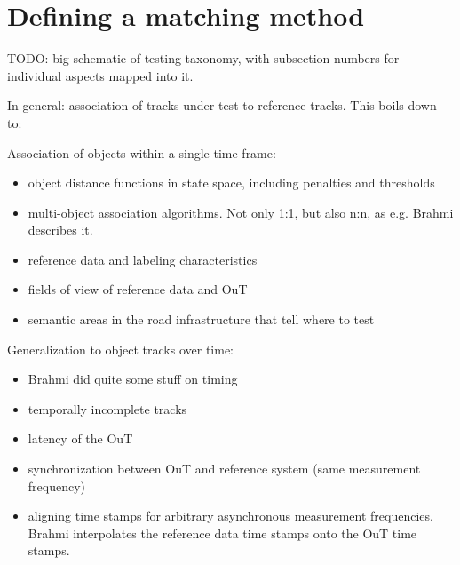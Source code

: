 \documentclass[conference]{IEEEtran}
\begin{document}






  






\section{Defining a matching method}
\label{sec:criteria}

TODO: big schematic of testing taxonomy, with subsection numbers for individual aspects mapped into it.


In general: association of tracks under test to reference tracks. This boils down to:

Association of objects within a single time frame:
\begin{itemize}
\item object distance functions in state space, including penalties and thresholds
\item multi-object association algorithms. Not only 1:1, but also n:n, as e.g. Brahmi \cite[Sec. 10.3]{Brahmi2020diss} describes it.
\item reference data and labeling characteristics
\item fields of view of reference data and OuT
\item semantic areas in the road infrastructure that tell where to test
\end{itemize}

Generalization to object tracks over time:
\begin{itemize}
\item Brahmi \cite{Brahmi2020diss} did quite some stuff on timing
\item temporally incomplete tracks 
\item latency of the OuT
\item synchronization between OuT and reference system (same measurement frequency)
\item aligning time stamps for arbitrary asynchronous measurement frequencies. Brahmi \cite[Sec. 10.2.7]{Brahmi2020diss} interpolates the reference data time stamps onto the OuT time stamps.
\end{itemize}
\end{document}
